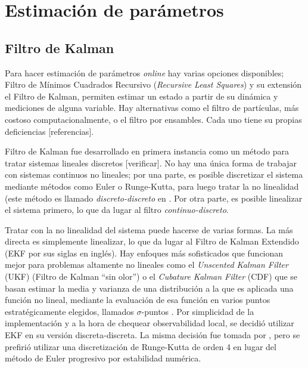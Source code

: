 \section{Estimación de parámetros} \label{met:estimacion}


\subsection{Filtro de Kalman}


Para hacer estimación de parámetros \textit{online} hay varias opciones disponibles; Filtro de Mínimos Cuadrados Recursivo (\textit{Recursive Least Squares}) y su extensión el Filtro de Kalman, permiten estimar un estado a partir de su dinámica  y mediciones de alguna variable. Hay alternativas como el filtro de partículas, más costoso computacionalmente, o el filtro por ensambles. Cada uno tiene su propias deficiencias [referencias]. 





Filtro de Kalman fue desarrollado en primera instancia como un método para tratar sistemas lineales discretos [verificar]. No hay una única forma de trabajar con sistemas continuos no lineales; por una parte, es posible discretizar el sistema mediante métodos como Euler o Runge-Kutta, para luego tratar la no linealidad (este método es llamado \textit{discreto-discreto} en \cite{Kulikov2014}. Por otra parte, es posible linealizar el sistema primero, lo que da lugar al filtro \textit{continuo-discreto}.

Tratar con la no linealidad del sistema puede hacerse de varias formas. La más directa es simplemente linealizar, lo que da lugar al Filtro de Kalman Extendido (EKF por sus siglas en inglés). Hay enfoques más sofisticados que funcionan mejor para problemas altamente no lineales como el \textit{Unscented Kalman Filter} (UKF) (Filtro de Kalman ``sin olor'') o el \textit{Cubature Kalman Filter} (CDF) que se basan estimar la media y varianza de una distribución a la que es aplicada una función no lineal, mediante la evaluación de esa función en varios puntos estratégicamente elegidos, llamados \(\sigma\)-puntos \cite{Kulikov2017}\cite{Simon2006}. Por simplicidad de la implementación y a la hora de chequear observabilidad local, se decidió utilizar EKF en su versión discreta-discreta. La misma decisión fue tomada por \cite{Hasan2020}, pero se prefirió utilizar una discretización de Runge-Kutta de orden 4 en lugar del método de Euler progresivo por estabilidad numérica.


